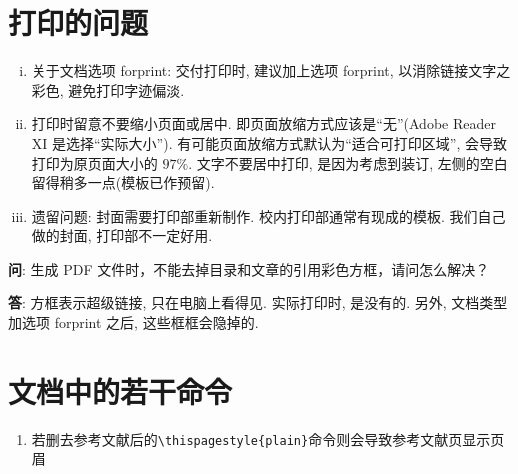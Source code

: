 

\section{打印的问题}
\begin{enumerate}[i)]
    \item  关于文档选项 forprint: 交付打印时, 建议加上选项 forprint, 以消除链接文字之彩色, 避免打印字迹偏淡.
    \item  打印时留意不要缩小页面或居中. 即页面放缩方式应该是``无''(Adobe Reader XI 是选择``实际大小'').
          有可能页面放缩方式默认为``适合可打印区域'', 会导致打印为原页面大小的 $97\%$.
          文字不要居中打印, 是因为考虑到装订, 左侧的空白留得稍多一点(模板已作预留).
    \item  遗留问题: 封面需要打印部重新制作.  校内打印部通常有现成的模板.
          我们自己做的封面, 打印部不一定好用.
\end{enumerate}

\textbf{问}: {\kaishu 生成 PDF 文件时，不能去掉目录和文章的引用彩色方框，请问怎么解决？}

\textbf{答}: {\kaishu 方框表示超级链接, 只在电脑上看得见. 实际打印时, 是没有的. 另外, 文档类型加选项 forprint 之后, 这些框框会隐掉的. }

\section{文档中的若干命令}
\begin{enumerate}
    \item 若删去参考文献后的\verb|\thispagestyle{plain}|命令则会导致参考文献页显示页眉
\end{enumerate}
